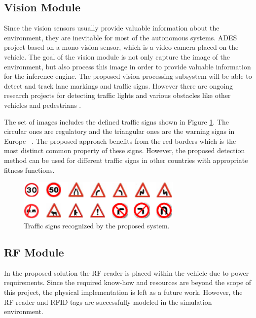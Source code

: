 \documentclass[a4paper,oneside,12pt]{report}
\begin{document}
\subsection{Vision Module}
Since the vision sensors usually provide valuable information about the environment, they are inevitable for most of the autonomous systems. ADES project based on a mono vision sensor, which is a video camera placed on the vehicle. The goal of the vision module is not only capture the image of the environment, but also process this image in order to provide valuable information for the inference engine. The proposed vision processing subsystem will be able to detect and track lane markings and traffic signs. However there are ongoing research projects for detecting traffic lights and various obstacles like other vehicles and pedestrians \cite{shen_robust_2009, gavrila_real-time_1999}.

The set of images includes the defined traffic signs shown in Figure \ref{fig:signs}. The circular ones are regulatory and the triangular ones are the warning signs in Europe ~\cite{ece_revision_2004}. The proposed approach benefits from the red borders which is the most distinct common property of these signs. However, the proposed detection method can be used for different traffic signs in other countries with appropriate fitness functions.

\begin{figure}[ht]
\begin{center}
\includegraphics[width=80mm]{img/signs_vertical.eps}
\caption{Traffic signs recognized by the proposed system.}
\label{fig:signs}
\end{center}
\end{figure}
\par

\subsection{RF Module}
In the proposed solution the RF reader is placed within the vehicle due to power requirements. Since the required know-how and resources are beyond the scope of this project, the physical implementation is left as a future work. However, the RF reader and RFID tags are successfully modeled in the simulation environment.
\end{document}
